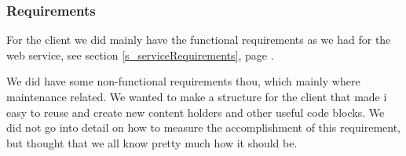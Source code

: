 \subsubsection{Requirements}
For the client we did mainly have the functional requirements as we had for the web service, see section \ref{s_serviceRequirements}, page \pageref{s_serviceRequirements}.

We did have some non-functional requirements thou, which mainly where maintenance related. We wanted to make a structure for the client that made i easy to reuse and create new content holders and other useful code blocks.
We did not go into detail on how to measure the accomplishment of this requirement, but thought that we all know pretty much how it should be.